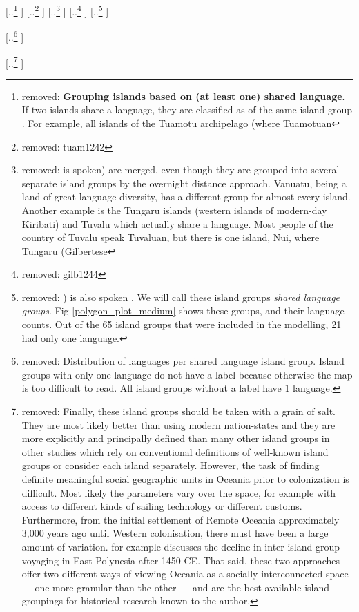 \documentclass[unnumsec,webpdf,modern,medium]{oup-authoring-template}
\providecommand{\DIFdeltex}[1]{{\protect\color{red} [..\footnote{removed: #1} ]}} %
\providecommand{\DIFdel}[1]{\texorpdfstring{\DIFdeltex{#1}}{}} %
\begin{document}
\DIFdel{\textbf{Grouping islands based on (at least one) shared language}. If two islands share a language, they are classified as of the same island group . For example, all islands of the Tuamotu archipelago (where Tuamotuan }%
\DIFdel{tuam1242}%
\DIFdel{is spoken) are merged, even though they are grouped into several separate island groups by the overnight distance approach. Vanuatu, being a land of great language diversity, has a different group for almost every island. Another example is the Tungaru islands (western islands of modern-day Kiribati) and Tuvalu which actually share a language. Most people of the country of Tuvalu speak Tuvaluan, but there is one island, Nui, where Tungaru (Gilbertese }%
\DIFdel{gilb1244}%
\DIFdel{) is also spoken \citep{faaniu1983tuvalu, macdonald_2020, omniglot_tuvaluan}. We will call these island groups \textit{shared language groups}. Fig \ref{polygon_plot_medium} shows these groups, and their language counts. Out of the 65 island groups that were included in the modelling, 21 had only one language.
}%

{%
\DIFdel{Distribution of languages per shared language island group. Island groups with only one language do not have a label because otherwise the map is too difficult to read. All island groups without a label have 1 language.}%
}

\DIFdel{Finally, these island groups should be taken with a grain of salt. They are most likely better than using modern nation-states and they are more explicitly and principally defined than many other island groups in other studies which rely on conventional definitions of well-known island groups or consider each island separately. However, the task of finding definite meaningful social geographic units in Oceania prior to colonization is difficult. Most likely the parameters vary over the space, for example with access to different kinds of sailing technology or different customs. Furthermore, from the initial settlement of Remote Oceania approximately 3,000 years ago until Western colonisation, there must have been a large amount of variation. \citep{rolett2002voyaging} for example discusses the decline in inter-island group voyaging in East Polynesia after 1450 CE. That said, these two approaches offer two different ways of viewing Oceania as a socially interconnected space --- one more granular than the other --- and are the best available island groupings for historical research known to the author.
}%
\end{document}
